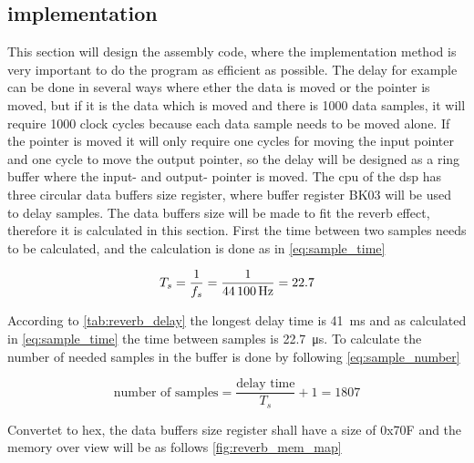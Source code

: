 \subsection{implementation}
This section will design the assembly code, where the implementation method is very important to do the program as efficient as possible. The delay for example can be done in several ways where ether the data is moved or the pointer is moved, but if it is the data which is moved and there is 1000 data samples, it will require 1000 clock cycles because each data sample needs to be moved alone. If the pointer is moved it will only require one cycles for moving the input pointer and one cycle to move the output pointer, so the delay will be designed as a ring buffer where the input- and output- pointer is moved. 
The \gls{cpu} of the \gls{dsp} has three circular data buffers size register, where buffer register BK03 will be used to delay samples. The data buffers size will be made to fit the \gls{reverb} effect, therefore it is calculated in this section. First the time between two samples needs to be calculated, and the calculation is done as in \autoref{eq:sample_time}

    \begin{equation}\label{eq:sample_time}
T_s=\frac{1}{f_s} = \frac{1}{\SI{44100}{\hertz}} = 22.7 \addunit{\SI{}{\micro\second}}
    \end{equation}

\startexplain
{}
    \stopexplain


According to \autoref{tab:reverb_delay} the longest delay time is \SI{41}{\milli\second} and as calculated in \autoref{eq:sample_time} the time between samples is \SI{22.7}{\micro\second}. To calculate the number of needed samples in the buffer is done by following \autoref{eq:sample_number}

\begin{equation} \label{eq:sample_number}
\text{number of samples}=\frac{\text{delay time}}{T_s}+1 = 
1807    
\end{equation}


Convertet to hex, the data buffers size register shall have a size of 0x70F and the memory over view will be as follows \autoref{fig:reverb_mem_map}

